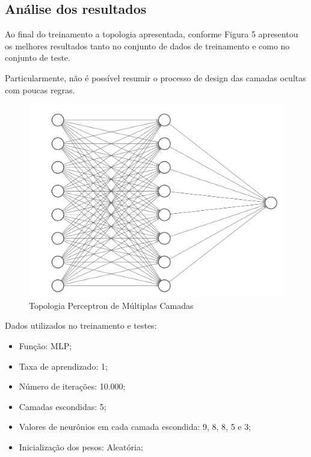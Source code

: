 \documentclass[conference]{IEEEtran}
\begin{document}
\subsection{Análise dos resultados}
    
    Ao final do treinamento a topologia apresentada, conforme Figura 5 apresentou os melhores resultados tanto no conjunto de dados de treinamento e como no conjunto de teste. 
    
    Particularmente, não é possível resumir o processo de design das camadas ocultas com poucas regras. 
    
        \begin{figure}[htbp]
	\centerline{\includegraphics[scale=0.4]{imagens/topologia_rede_neural.png}}
	\caption{Topologia Perceptron de Múltiplas Camadas}
	
	\label{fig}
	\end{figure}
    
   Dados utilizados no treinamento e testes:
    
     \begin{itemize}
    
    \item Função: MLP;
    \item Taxa de aprendizado: 1;
    \item Número de iterações: 10.000;
    \item Camadas escondidas: 5;
    \item Valores de neurônios em cada camada escondida: 9, 8, 8, 5 e 3;
    \item  Inicialização dos pesos: Aleatória;
    
    \end{itemize}
  
\end{document}

